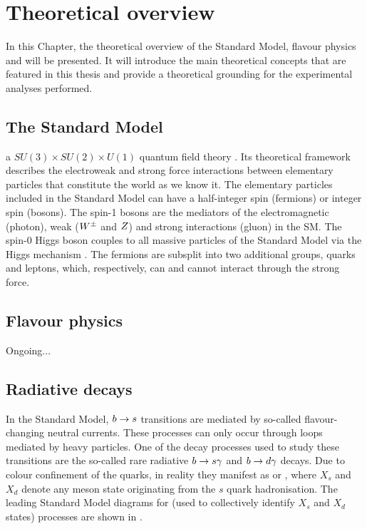 \chapter{Theoretical overview}

In this Chapter, the theoretical overview of the Standard Model, flavour physics and \BtoXsgamma will be presented.
It will introduce the main theoretical concepts that are featured in this thesis and provide a theoretical grounding for the experimental analyses performed.

\section{The Standard Model}

a $SU(3)\times SU(2)\times U(1)$ quantum field theory \cite{Peskin:1995ev}.
Its theoretical framework describes the electroweak and strong force interactions between elementary particles that constitute the world as we know it.
The elementary particles included in the Standard Model can have a half-integer spin (fermions) or integer spin (bosons).
The spin-1 bosons are the mediators of the electromagnetic (photon), weak ($W^\pm$ and $Z$) and strong interactions (gluon) in the SM.
The spin-0 Higgs boson couples to all massive particles of the Standard Model via the Higgs mechanism \cite{PhysRevLett.13.508}.
The fermions are subsplit into two additional groups, quarks and leptons, which, respectively, can and cannot interact through the strong force.

\section{Flavour physics}

Ongoing...

\section{Radiative decays \texorpdfstring{\BtoXsdgamma}{B->Xsg}}\label{eq:btosgamma_theory}

In the Standard Model, $b\rightarrow s$ transitions are mediated by so-called flavour-changing neutral currents.
These processes can only occur through loops mediated by heavy particles.
One of the decay processes used to study these transitions are the so-called rare radiative $b\rightarrow s\gamma$ and $b\rightarrow d\gamma$ decays.
Due to colour confinement of the quarks, in reality they manifest as \BtoXsgamma or \BtoXdgamma, where $X_s$ and $X_d$ denote any meson state originating from the $s$ quark hadronisation.
The leading Standard Model diagrams for \BtoXsdgamma (used to collectively identify $X_s$ and $X_d$ states) processes are shown in .

